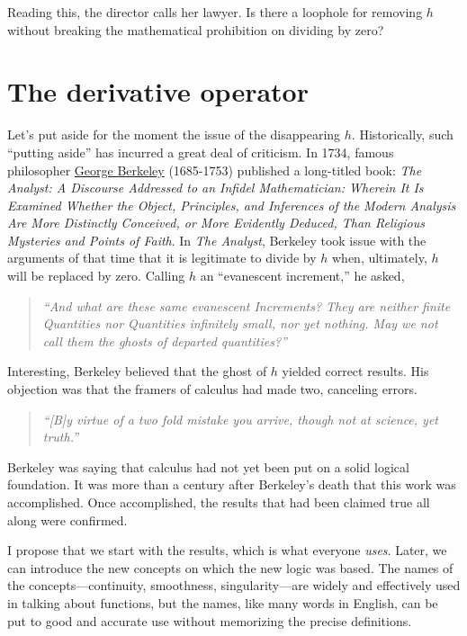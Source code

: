 \documentclass[
]{book}
\begin{document}
Reading this, the director calls her lawyer. Is there a loophole for removing \(h\) without breaking the mathematical prohibition on dividing by zero?

\hypertarget{the-derivative-operator}{%
\section{The derivative operator}\label{the-derivative-operator}}

Let's put aside for the moment the issue of the disappearing \(h\). Historically, such ``putting aside'' has incurred a great deal of criticism. In 1734, famous philosopher \href{https://en.wikipedia.org/wiki/George_Berkeley}{George Berkeley} (1685-1753) published a long-titled book: \emph{The Analyst: A Discourse Addressed to an Infidel Mathematician: Wherein It Is Examined Whether the Object, Principles, and Inferences of the Modern Analysis Are More Distinctly Conceived, or More Evidently Deduced, Than Religious Mysteries and Points of Faith}. In \emph{The Analyst}, Berkeley took issue with the arguments of that time that it is legitimate to divide by \(h\) when, ultimately, \(h\) will be replaced by zero. Calling \(h\) an ``evanescent increment,'' he asked,

\begin{quote}
\emph{``And what are these same evanescent Increments? They are neither finite Quantities nor Quantities infinitely small, nor yet nothing. May we not call them the ghosts of departed quantities?''}
\end{quote}

Interesting, Berkeley believed that the ghost of \(h\) yielded correct results. His objection was that the framers of calculus had made two, canceling errors.

\begin{quote}
\emph{``{[}B{]}y virtue of a two fold mistake you arrive, though not at science, yet truth.''}
\end{quote}

Berkeley was saying that calculus had not yet been put on a solid logical foundation. It was more than a century after Berkeley's death that this work was accomplished. Once accomplished, the results that had been claimed true all along were confirmed.

I propose that we start with the results, which is what everyone \emph{uses}. Later, we can introduce the new concepts on which the new logic was based. The names of the concepts---continuity, smoothness, singularity---are widely and effectively used in talking about functions, but the names, like many words in English, can be put to good and accurate use without memorizing the precise definitions.
\end{document}
